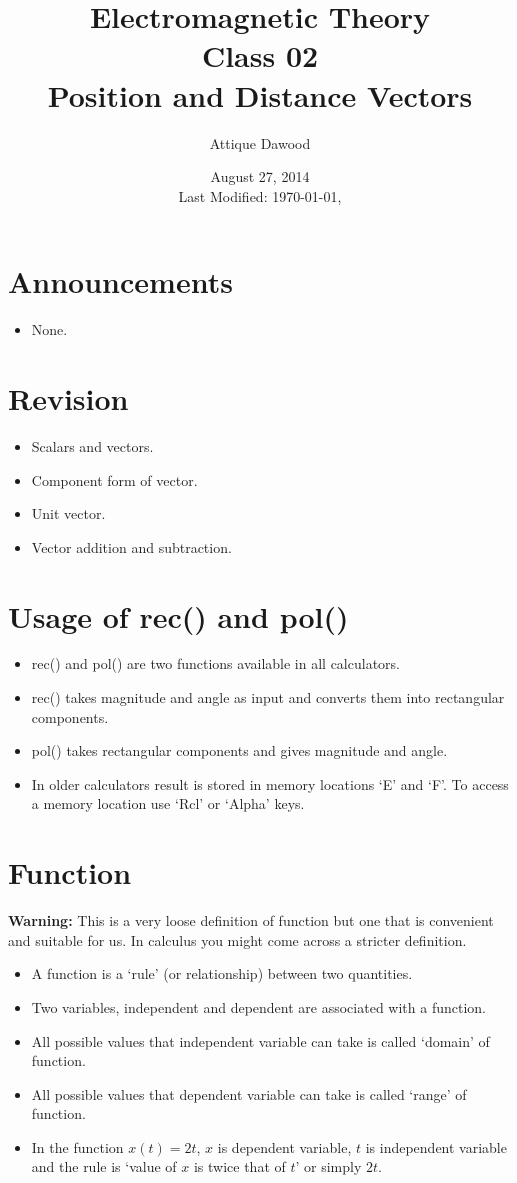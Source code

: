 \documentclass[12pt,a4paper]{article}
\title{Electromagnetic Theory\\Class 02\\Position and Distance Vectors}
\author{Attique Dawood}
\date{August 27, 2014\\[0.2cm] Last Modified: \today, \currenttime}
\begin{document}
\maketitle
\section{Announcements}
\begin{itemize}
\item None.
\end{itemize}
\section{Revision}
\begin{itemize}
\item Scalars and vectors.
\item Component form of vector.
\item Unit vector.
\item Vector addition and subtraction.
\end{itemize}
\section{Usage of rec() and pol()}
\begin{itemize}
\item rec() and pol() are two functions available in all calculators.
\item rec() takes magnitude and angle as input and converts them into rectangular components.
\item pol() takes rectangular components and gives magnitude and angle.
\item In older calculators result is stored in memory locations `E' and `F'. To access a memory location use `Rcl' or `Alpha' keys.
\end{itemize}
\section{Function}
\noindent\textbf{Warning:} This is a very loose definition of function but one that is convenient and suitable for us. In calculus you might come across a stricter definition.
\begin{itemize}
\item A function is a `rule' (or relationship) between two quantities.
\item Two variables, independent and dependent are associated with a function.
\item All possible values that independent variable can take is called `domain' of function.
\item All possible values that dependent variable can take is called `range' of function.
\item In the function $x(t)=2t$, $x$ is dependent variable, $t$ is independent variable and the rule is `value of $x$ is twice that of $t$' or simply $2t$.
\end{itemize}
\end{document}
